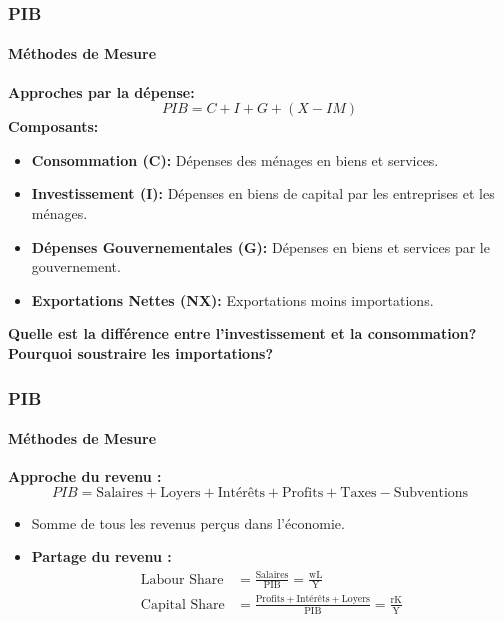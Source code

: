 \documentclass{beamer}
\begin{document}
\begin{frame}
    \frametitle{PIB}
    \framesubtitle{Méthodes de Mesure}
        \textbf{Approches par la dépense:}
        \begin{equation}
            PIB = C + I + G + (X - IM)
        \end{equation}
        \textbf{Composants:}
        \begin{itemize}
            \item \textbf{Consommation (C):} 
            Dépenses des ménages en biens et services.
            \item \textbf{Investissement (I):}  
            Dépenses en biens de capital par les entreprises et les ménages.
            \item \textbf{Dépenses Gouvernementales (G):}  
            Dépenses en biens et services par le gouvernement.
            \item \textbf{Exportations Nettes (NX):} 
            Exportations moins importations.
            \pause
        \end{itemize}
        \textbf{Quelle est la différence entre l'investissement et la consommation?}
        \textbf{Pourquoi soustraire les importations?}
\end{frame}

\begin{frame}
    \frametitle{PIB}  
        \framesubtitle{Méthodes de Mesure}
        \textbf{Approche du revenu :}
        \begin{equation}
            PIB = \text{Salaires} + \text{Loyers} + \text{Intérêts} + \text{Profits} + \text{Taxes} - \text{Subventions}
        \end{equation}

        \begin{itemize}
            \item Somme de tous les revenus perçus dans l'économie.
            \item \textbf{Partage du revenu :}
            \begin{align}
                \text{Labour Share} &= \frac{\text{Salaires}}{\text{PIB}} =
                \frac{\text{wL}}{\text{Y}} \\
                \text{Capital Share} &= \frac{\text{Profits} + \text{Intérêts} + \text{Loyers}}{\text{PIB}}
                = \frac{\text{rK}}{\text{Y}}
            \end{align}
        \end{itemize}
\end{frame}
\end{document}
